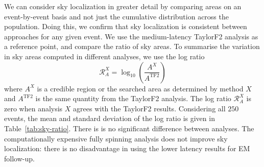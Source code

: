 We can consider sky localization in greater detail by comparing areas on an event-by-event basis and not just the cumulative distribution across the population. Doing this, we confirm that sky localization is consistent between approaches for any given event. We use the medium-latency TaylorF2 analysis as a reference point, and compare the ratio of sky areas. To summarise the variation in sky areas computed in different analyses, we use the log ratio
\begin{equation}
\mathcal{R}_A^X = \log_{10}\left(\frac{A^X}{A^\mathrm{TF2}}\right)
\end{equation}
where $A^X$ is a credible region or the searched area as determined by method $X$ and $A^\mathrm{TF2}$ is the same quantity from the TaylorF2 analysis. The log ratio $\mathcal{R}_A^X$ is zero when analysis $X$ agrees with the TaylorF2 results. Considering all $250$ events, the mean and standard deviation of the log ratio is given in Table~\ref{tab:sky-ratio}. There is is no significant difference between analyses. The computationally expensive fully spinning analysis does not improve sky localization: there is no disadvantage in using the lower latency results for EM follow-up.